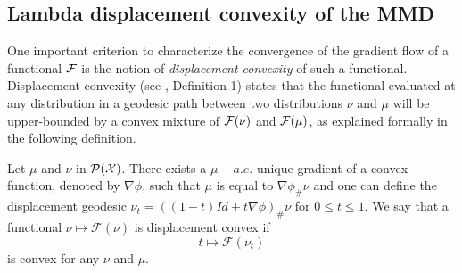 


\subsection{Lambda displacement convexity of the MMD}

One important criterion to characterize the convergence of the gradient flow of a functional ${{\mathcal F}}$ is the notion of \textit{displacement convexity} of such a functional. Displacement convexity (see \cite{Villani:2004}, Definition 1) states that the functional evaluated at any distribution in a geodesic path between two distributions $\nu$ and $\mu$ will be upper-bounded by a convex mixture of ${{\mathcal F}}(\nu)$ and ${{\mathcal F}}(\mu)$, as explained formally in the following definition.
\begin{definition}\label{def:displacement_convexity}
 Let $\mu$
and $\nu$ in $\mathcal{P}({{\mathcal X}})$. There exists a $\mu-a.e.$
unique gradient of a convex function, denoted by $\nabla\phi$, such that $\mu$
is equal to $\nabla\phi_{\#}\nu$ and one can define the displacement geodesic $\nu_{t}=((1-t)Id+t\nabla\phi)_{\#}\nu$
for $0\leq t\leq1$. We say that a functional $\nu\mapsto\mathcal{F}(\nu)$
is displacement convex if 
\begin{equation}
t\mapsto\mathcal{F}(\nu_{t})
\end{equation}
 is convex for any $\nu$ and $\mu$. %
\end{definition}


